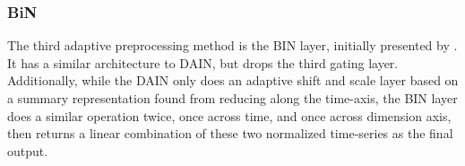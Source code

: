 \documentclass{statsmsc}
\begin{document}
{%



\subsubsection{BiN}%
\label{ssub:BiN}



The third adaptive preprocessing method is the \ac{BIN} layer, initially
presented by \cite{bin}. It has a similar architecture to \ac{DAIN}, but drops the
third gating layer. Additionally, while the \ac{DAIN} only does an adaptive shift and scale layer
based on a summary representation found from reducing along the time-axis, the \ac{BIN} layer
does a similar operation twice, once across time, and once across dimension axis, then returns
a linear combination of these two normalized time-series as the final output.

}
\end{document}
